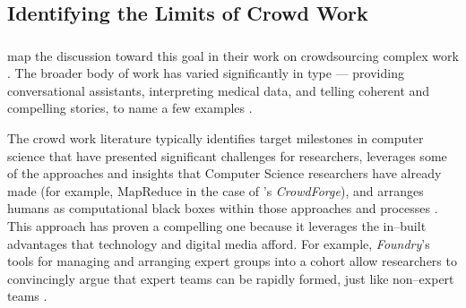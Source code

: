 \documentclass[trackingWork]{subfiles}
\begin{document}
\subsection[What are the limits of crowd work]{Identifying the Limits of Crowd Work}\label{sec:complexity}
\subsubsection{\crowdworkpers}
\citeauthor{crowdForgeKittur}
map the discussion toward this goal in their work on
crowdsourcing complex work
\cite{crowdForgeKittur}.
The broader body of work has varied significantly in type
--- providing conversational assistants,
interpreting medical data, and
telling coherent and compelling stories,
to name a few examples
\cite{Lasecki:2013:CCC:2501988.2502057,mavandadi2012distributed,KimStoria}.

The crowd work literature typically identifies target milestones in computer science
that have presented significant challenges for researchers,
leverages some of the approaches and insights that Computer Science researchers have already made
(for example, MapReduce in the case of \citeauthor{crowdForgeKittur}'s \textit{CrowdForge}),
and arranges humans as computational black boxes within those approaches and processes
\cite[][and others]{crowdForgeKittur,foundry}.
This approach has proven a compelling one because
it leverages the in--built advantages that technology and digital media afford.
For example, \textit{Foundry}'s tools for managing and arranging expert groups into a cohort
allow researchers to convincingly argue that expert teams can be rapidly formed,
just like non--expert teams
\cite{foundry}.
\end{document}
